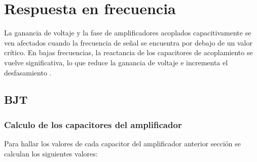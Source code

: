 \section{Respuesta en frecuencia}
La ganancia de voltaje y la fase de amplificadores acoplados capacitivamente se
ven afectados cuando la frecuencia de señal se encuentra por debajo de un valor
crítico. En bajas frecuencias, la reactancia de los capacitores de acoplamiento
se vuelve significativa, lo que reduce la ganancia de voltaje e incrementa el
desfasamiento \cite{Floyd}.

\subsection{BJT}

\subsubsection{Calculo de los capacitores del amplificador}
Para hallar los valores de cada capacitor del amplificador anterior sección se
calculan los siguientes valores:

